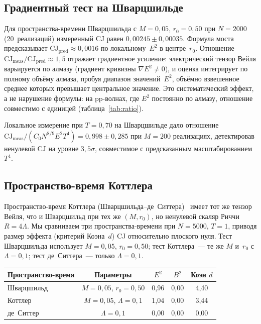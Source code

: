 \documentclass[12pt,a4paper]{article}
\theoremstyle{plain}
\theoremstyle{definition}
\theoremstyle{remark}
\newcommand{\CJ}{\mathrm{CJ}}
\begin{document}
\subsection{Градиентный тест на Шварцшильде}
\label{sec:schwarzschild}

Для пространства-времени Шварцшильда с $M = 0{,}05$,
$r_0 = 0{,}50$ при $N = 2000$ (20~реализаций) измеренный
CJ равен $0{,}00245 \pm 0{,}00035$.  Формула моста
предсказывает
$\CJ_{\mathrm{pred}} \approx 0{,}0016$ по локальному~$E^2$
в центре~$r_0$.  Отношение
$\CJ_{\mathrm{meas}} / \CJ_{\mathrm{pred}} \approx 1{,}5$
отражает градиентное усиление: электрический тензор Вейля
варьируется по алмазу (градиент кривизны
$\nabla E^2 \neq 0$), и оценка интегрирует по полному
объёму алмаза, пробуя диапазон значений~$E^2$, объёмно
взвешенное среднее которых превышает центральное значение.
Это систематический эффект, а не нарушение формулы: на
pp-волнах, где $E^2$ постоянно по алмазу, отношение
совместимо с единицей (таблица~\ref{tab:ratio}).

Локальное измерение при $T = 0{,}70$ на Шварцшильде дало
отношение $\CJ_{\mathrm{meas}} / (C_0 N^{8/9} E^2 T^4) =
0{,}998 \pm 0{,}285$ при $M = 200$ реализациях, детектировав
ненулевой CJ на уровне $3{,}5\sigma$, совместимое с
предсказанным масштабированием~$T^4$.

\subsection{Пространство-время Коттлера}
\label{sec:kottler}

Пространство-время
Коттлера (Шварцшильда--де~Ситтера)~\cite{Kottler:1918}
имеет тот же тензор Вейля, что и Шварцшильд при тех же
$(M, r_0)$, но ненулевой скаляр Риччи $R = 4\Lambda$.  Мы
сравниваем три пространства-времени при $N = 5000$, $T = 1$,
приводя размер эффекта (критерий Коэна~$d$) CJ относительно
плоского нуля.  Тест Шварцшильда использует $M = 0{,}05$,
$r_0 = 0{,}50$; тест Коттлера~--- те же $M$ и~$r_0$ с
$\Lambda = 0{,}1$; тест де~Ситтера~--- только
$\Lambda = 0{,}1$.

\begin{center}
\begin{tabular}{lcccc}
\toprule
Пространство-время & Параметры & $E^2$ & $B^2$ & Коэн $d$ \\
\midrule
Шварцшильд  & $M = 0{,}05$, $r_0 = 0{,}50$ & 0,96 & 0,00 & 4,40 \\
Коттлер     & $M = 0{,}05$, $\Lambda = 0{,}1$ & 1,04 & 0,00 & 3,44 \\
де~Ситтер   & $\Lambda = 0{,}1$ & 0,00 & 0,00 & 0,00 \\
\bottomrule
\end{tabular}
\end{center}
\end{document}
